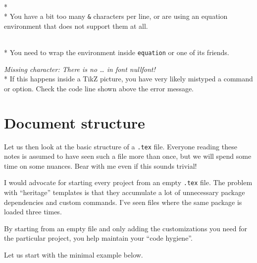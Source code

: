 \medskip{}\\*
\medskip{}\\*
You have a bit too many \verb|&| characters per line,
or are using an equation environment that does not support them at all.

\medskip{}\\*
You need to wrap the environment inside \verb|equation| or one of its friends.

\medskip\noindent\emph{Missing character: There is no \emph{\dots} in font nullfont!}\\*
If this happens inside a TikZ picture, you have very likely mistyped a command or option.
Check the code line shown above the error message.




%
%
%
\section{Document structure}\label{sec:document structure}

Let us then look at the basic structure of a \verb|.tex| file.
Everyone reading these notes is assumed to have seen such a file more than once,
but we will spend some time on some nuances.
Bear with me even if this sounds trivial!

\begin{practices}
I would advocate for starting every project from an empty \verb|.tex| file.
The problem with ``heritage'' templates is that they accumulate a lot
of unnecessary package dependencies and custom commands.
I've seen files where the same package is loaded three times.

By starting from an empty file
and only adding the customizations you need for the particular project,
you help maintain your ``code hygiene''.
\end{practices}

Let us start with the minimal example below.


